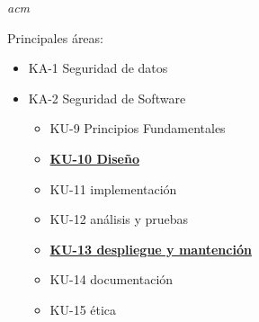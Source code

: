 \begin{flushright}
    \textit{acm}
\end{flushright}
Principales áreas: 
\begin{itemize}
    \item KA-1 Seguridad de datos
    \item KA-2 Seguridad de Software
    \begin{itemize}
            \item KU-9 Principios Fundamentales
            \item \underline{\textbf{KU-10  Diseño}}
            \item KU-11 implementación
            \item KU-12 análisis y pruebas
            \item \underline{\textbf{KU-13 despliegue y mantención}}
            \item KU-14 documentación
            \item KU-15 ética
            

\end{itemize}
\end{itemize}
